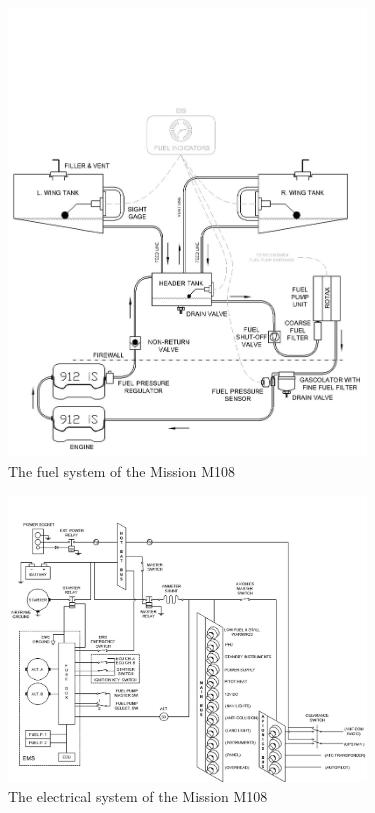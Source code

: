 \documentclass[11pt,a4paper]{article}
\begin{document}
\begin{figure}[ht!]
	\begin{center}
		\includegraphics[width=9.5cm, trim = 0.5cm 1cm 0.5cm 12.5cm,clip]{pics/PIC004.jpg}
		\caption{The fuel system of the Mission M108}
		\label{fig:PIC004}
	\end{center}
\end{figure}
\begin{figure}[ht!]
	\begin{center}
		\includegraphics[width=9.5cm, trim = 0.5cm 0cm 0.5cm 2cm,clip]{pics/PIC005.jpg}
		\caption{The electrical system of the Mission M108}
		\label{fig:PIC005}
	\end{center}
\end{figure}
\end{document}
